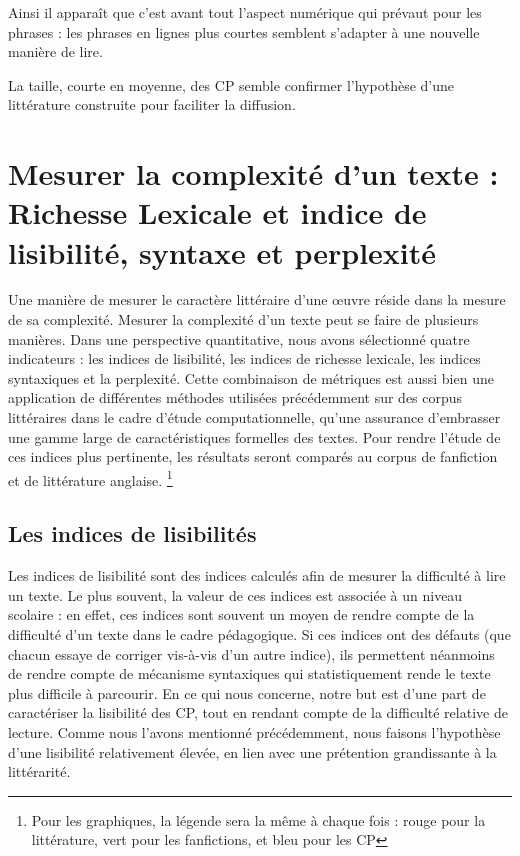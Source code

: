 \documentclass[12pt,a4paper,oneside,titlepage]{book} %
\begin{document}
Ainsi il apparaît que c'est avant tout l'aspect numérique qui prévaut pour les phrases : les phrases en lignes plus courtes semblent s'adapter à une nouvelle manière de lire.

La taille, courte en moyenne, des CP semble confirmer l'hypothèse d'une littérature construite pour faciliter la diffusion.

\section{Mesurer la complexité d'un texte : Richesse Lexicale et indice de lisibilité, syntaxe et perplexité}
	
	Une manière de mesurer le caractère littéraire d'une œuvre réside dans la mesure de sa complexité. Mesurer la complexité d'un texte peut se faire de plusieurs manières. Dans une perspective quantitative, nous avons sélectionné quatre indicateurs : les indices de lisibilité, les indices de richesse lexicale, les indices syntaxiques et la perplexité. 
    Cette combinaison de métriques est aussi bien une application de différentes méthodes utilisées précédemment sur des corpus littéraires dans le cadre d'étude computationnelle, qu'une assurance d'embrasser une gamme large de caractéristiques formelles des textes. 
	Pour rendre l'étude de ces indices plus pertinente, les résultats seront comparés  au corpus de fanfiction et de littérature anglaise. \footnote{Pour les graphiques, la légende sera la même à chaque fois : rouge pour la littérature, vert pour les fanfictions, et bleu pour les CP}

	\subsection{Les indices de lisibilités} 
    
	Les indices de lisibilité sont des indices calculés afin de mesurer la difficulté à lire un texte. Le plus souvent, la valeur de ces indices est associée à un niveau scolaire : en effet, ces indices sont souvent un moyen de rendre compte de la difficulté d'un texte dans le cadre pédagogique. Si ces indices ont des défauts (que chacun essaye de corriger vis-à-vis d'un autre indice), ils permettent néanmoins de rendre compte de mécanisme syntaxiques qui statistiquement rende le texte plus difficile à parcourir.
	En ce qui nous concerne, notre but est d'une part de caractériser la lisibilité des CP, tout en rendant compte de la difficulté relative de lecture. Comme nous l'avons mentionné précédemment, nous faisons l'hypothèse d'une lisibilité relativement élevée, en lien avec une prétention grandissante à la littérarité.
	
\end{document}
